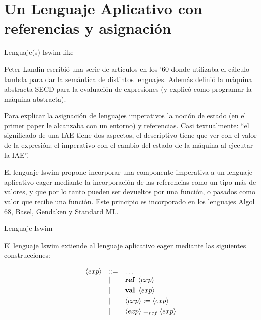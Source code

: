 \documentclass{beamer}
\newcommand{\ex}{\left\langle exp\right\rangle}
\begin{document}
\section{Un Lenguaje Aplicativo con referencias y asignación}


\begin{frame}{Lenguaje(s) Iswim-like}

  Peter Landin escribió una serie de artículos en los '60 donde
  utilizaba el cálculo lambda para dar la semántica de distintos
  lenguajes. Además definió la máquina abstracta SECD para la
  evaluación de expresiones (y explicó como programar la máquina
  abstracta). %
  \bigskip
  \pause

  Para explicar la asignación de lenguajes imperativos la noción de
  estado (en el primer paper le alcanzaba con un entorno) y referencias.
  Casi textualmente: ``el significado de una IAE tiene dos aspectos, el
  descriptivo tiene que ver con el valor de la expresión; el imperativo
  con el cambio del estado de la máquina al ejecutar la IAE''.
  
  \pause
  \bigskip
  
  El lenguaje Iswim propone incorporar una componente imperativa a un
  lenguaje aplicativo eager mediante la incorporación de las
  referencias como un tipo más de valores, y que por lo tanto pueden
  ser devueltos por una función, o pasados como valor que recibe una
  función. Este principio es incorporado en los lenguajes Algol 68,
  Basel, Gendaken y Standard ML.


\end{frame}


\begin{frame}{Lenguaje Iswim}


  El lenguaje Iswim extiende al lenguaje aplicativo eager mediante las
  siguientes construcciones:


\[
\begin{array}{lll}
  \ex & ::= & \ldots \\
 & | & \textbf{ref}\ \ex\ \smallskip\\
 & | &  \textbf{val}\ \ex\ \smallskip\\
 & | &   \ex:=\ex  \smallskip\\
 & | &   \ex=_{ref}\ex 
\end{array}
\]

\end{frame}
\end{document}
